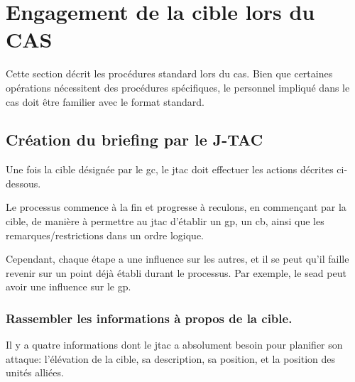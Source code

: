 \section{Engagement de la cible lors du CAS} %

Cette section décrit les procédures standard lors du \gls{cas}. Bien que certaines opérations nécessitent des procédures spécifiques, le personnel impliqué dans le \gls{cas} doit être familier avec le format standard.

\subsection{Création du briefing par le J-TAC} %
Une fois la cible désignée par le \gls{gc}, le \gls{jtac} doit effectuer les actions décrites ci-dessous.

Le processus commence à la fin et progresse à reculons, en commençant par la cible, de manière à permettre au \gls{jtac} d'établir un \gls{gp}, un \gls{cb}, ainsi que les remarques/restrictions dans un ordre logique.

Cependant, chaque étape a une influence sur les autres, et il se peut qu'il faille revenir sur un point déjà établi durant le processus. Par exemple, le \gls{sead} peut avoir une influence sur le \gls{gp}.


\subsubsection{Rassembler les informations à propos de la cible.}%

Il y a quatre informations dont le \gls{jtac} a absolument besoin pour planifier son attaque: l'élévation de la cible, sa description, sa position, et la position des unités alliées.


